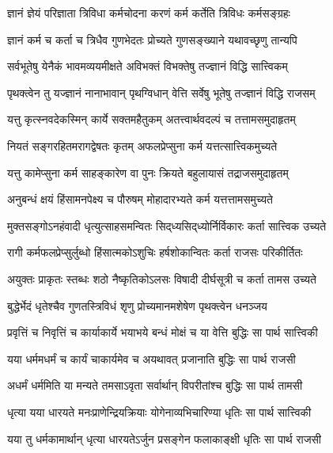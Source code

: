 \twolineshloka
{ज्ञानं ज्ञेयं परिज्ञाता त्रिविधा कर्मचोदना}
{करणं कर्म कर्तेति त्रिविधः कर्मसङ्ग्रहः}%

\twolineshloka
{ज्ञानं कर्म च कर्ता च त्रिधैव गुणभेदतः}
{प्रोच्यते गुणसङ्ख्याने यथावच्छृणु तान्यपि}%

\twolineshloka
{सर्वभूतेषु येनैकं भावमव्ययमीक्षते}
{अविभक्तं विभक्तेषु तज्ज्ञानं विद्धि सात्त्विकम्}%

\twolineshloka
{पृथक्त्वेन तु यज्ज्ञानं नानाभावान् पृथग्विधान्}
{वेत्ति सर्वेषु भूतेषु तज्ज्ञानं विद्धि राजसम्}%

\twolineshloka
{यत्तु कृत्स्नवदेकस्मिन् कार्ये सक्तमहैतुकम्}
{अतत्त्वार्थवदल्पं च तत्तामसमुदाहृतम्}%

\twolineshloka
{नियतं सङ्गरहितमरागद्वेषतः कृतम्}
{अफलप्रेप्सुना कर्म यत्तत्सात्त्विकमुच्यते}%

\twolineshloka
{यत्तु कामेप्सुना कर्म साहङ्कारेण वा पुनः}
{क्रियते बहुलायासं तद्राजसमुदाहृतम्}%

\twolineshloka
{अनुबन्धं क्षयं हिंसामनपेक्ष्य च पौरुषम्}
{मोहादारभ्यते कर्म यत्तत्तामसमुच्यते}%

\twolineshloka
{मुक्तसङ्गोऽनहंवादी धृत्युत्साहसमन्वितः}
{सिद्‌ध्यसिद्‌ध्योर्निर्विकारः कर्ता सात्त्विक उच्यते}%

\twolineshloka
{रागी कर्मफलप्रेप्सुर्लुब्धो हिंसात्मकोऽशुचिः}
{हर्षशोकान्वितः कर्ता राजसः परिकीर्तितः}%

\twolineshloka
{अयुक्तः प्राकृतः स्तब्धः शठो नैष्कृतिकोऽलसः}
{विषादी दीर्घसूत्री च कर्ता तामस उच्यते}%

\twolineshloka
{बुद्धेर्भेदं धृतेश्चैव गुणतस्त्रिविधं शृणु}
{प्रोच्यमानमशेषेण पृथक्त्वेन धनञ्जय}%

\twolineshloka
{प्रवृत्तिं च निवृत्तिं च कार्याकार्ये भयाभये}
{बन्धं मोक्षं च या वेत्ति बुद्धिः सा पार्थ सात्त्विकी}%

\twolineshloka
{यया धर्ममधर्मं च कार्यं चाकार्यमेव च}
{अयथावत् प्रजानाति बुद्धिः सा पार्थ राजसी}%

\twolineshloka
{अधर्मं धर्ममिति या मन्यते तमसाऽवृता}
{सर्वार्थान् विपरीतांश्च बुद्धिः सा पार्थ तामसी}%

\twolineshloka
{धृत्या यया धारयते मनःप्राणेन्द्रियक्रियाः}
{योगेनाव्यभिचारिण्या धृतिः सा पार्थ सात्त्विकी}%

\twolineshloka
{यया तु धर्मकामार्थान् धृत्या धारयतेऽर्जुन}
{प्रसङ्गेन फलाकाङ्क्षी धृतिः सा पार्थ राजसी}%

